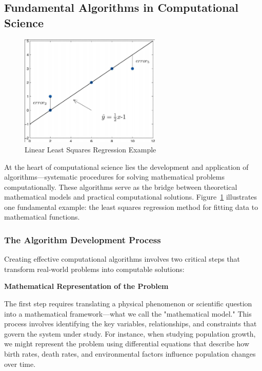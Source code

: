 \subsection{Fundamental Algorithms in Computational Science}

\begin{figure}[h]
 \centering
 \includegraphics[width=0.6\textwidth]{images/least_squares_regression.png}
 \caption{Linear Least Squares Regression Example}
 \label{fig:least_squares_regression}
\end{figure}

At the heart of computational science lies the development and application of algorithms—systematic procedures for solving mathematical problems computationally. These algorithms serve as the bridge between theoretical mathematical models and practical computational solutions. Figure~\ref{fig:least_squares_regression} illustrates one fundamental example: the least squares regression method for fitting data to mathematical functions.

\subsubsection{The Algorithm Development Process}

Creating effective computational algorithms involves two critical steps that transform real-world problems into computable solutions:

\textbf{Mathematical Representation of the Problem}

The first step requires translating a physical phenomenon or scientific question into a mathematical framework—what we call the "mathematical model." This process involves identifying the key variables, relationships, and constraints that govern the system under study. For instance, when studying population growth, we might represent the problem using differential equations that describe how birth rates, death rates, and environmental factors influence population changes over time.

